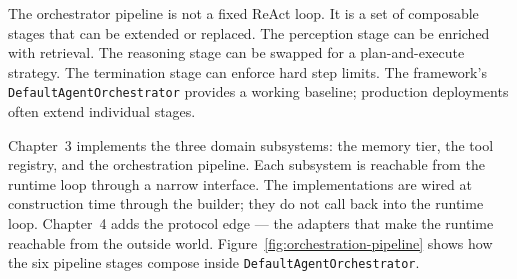 \begin{tipbox}
  The orchestrator pipeline is not a fixed ReAct loop.
  It is a set of composable stages that can be extended or replaced.
  The perception stage can be enriched with retrieval.
  The reasoning stage can be swapped for a plan-and-execute strategy.
  The termination stage can enforce hard step limits.
  The framework's \texttt{DefaultAgentOrchestrator} provides a working
  baseline; production deployments often extend individual stages.
\end{tipbox}

\begin{takeawaybox}
  Chapter~3 implements the three domain subsystems: the memory tier, the tool
  registry, and the orchestration pipeline.
  Each subsystem is reachable from the runtime loop through a narrow interface.
  The implementations are wired at construction time through the builder;
  they do not call back into the runtime loop.
  Chapter~4 adds the protocol edge — the adapters that make the runtime
  reachable from the outside world.
  Figure~\ref{fig:orchestration-pipeline} shows how the six pipeline stages
  compose inside \texttt{DefaultAgentOrchestrator}.
\end{takeawaybox}
